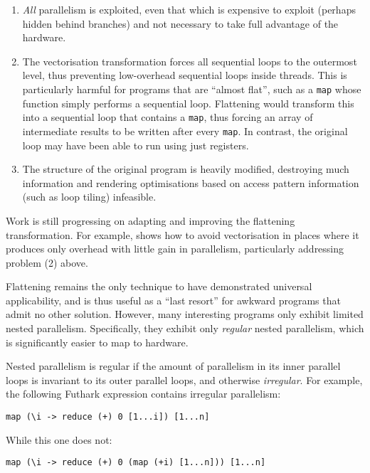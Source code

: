 \begin{enumerate}
\item \textit{All} parallelism is exploited, even that which is
  expensive to exploit (perhaps hidden behind branches) and not
  necessary to take full advantage of the hardware.
\item The vectorisation transformation forces all sequential loops to
  the outermost level, thus preventing low-overhead sequential loops
  inside threads.  This is particularly harmful for programs that are
  ``almost flat'', such as a \lstinline{map} whose function simply
  performs a sequential loop.  Flattening would transform this into a
  sequential loop that contains a \lstinline{map}, thus forcing an
  array of intermediate results to be written after every
  \lstinline{map}.  In contrast, the original loop may have been able
  to run using just registers.
\item The structure of the original program is heavily modified,
  destroying much information and rendering optimisations based on
  access pattern information (such as loop tiling) infeasible.
\end{enumerate}

Work is still progressing on adapting and improving the flattening
transformation.  For example, \cite{Keller:2012:VA:2364506.2364512}
shows how to avoid vectorisation in places where it produces only
overhead with little gain in parallelism, particularly addressing
problem (2) above.

Flattening remains the only technique to have demonstrated universal
applicability, and is thus useful as a ``last resort'' for awkward
programs that admit no other solution.  However, many interesting
programs only exhibit limited nested parallelism.  Specifically, they
exhibit only \textit{regular} nested parallelism, which is
significantly easier to map to hardware.

Nested parallelism is regular if the amount of parallelism in its
inner parallel loops is invariant to its outer parallel loops, and
otherwise \textit{irregular}.  For example, the following Futhark
expression contains irregular parallelism:

\begin{lstlisting}
map (\i -> reduce (+) 0 [1...i]) [1...n]
\end{lstlisting}

While this one does not:

\begin{lstlisting}
map (\i -> reduce (+) 0 (map (+i) [1...n])) [1...n]
\end{lstlisting}

